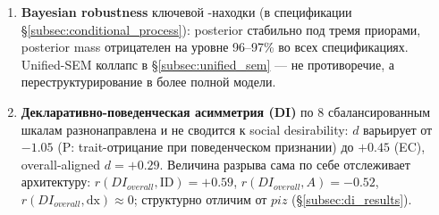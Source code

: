 \begin{enumerate}
    \item \textbf{Bayesian robustness} ключевой \IMM{}-находки (в спецификации §\ref{subsec:conditional_process}): posterior стабильно под тремя приорами, posterior mass отрицателен на уровне 96--97\% во всех спецификациях. Unified-SEM коллапс \IMM{} в §\ref{subsec:unified_sem} --- не противоречие, а переструктурирование в более полной модели.
    \item \textbf{Декларативно-поведенческая асимметрия (DI)} по 8 сбалансированным шкалам разнонаправлена и не сводится к social desirability: $d$ варьирует от $-1.05$ (P: trait-отрицание при поведенческом признании) до $+0.45$ (EC), overall-aligned $d{=}{+}0.29$. Величина разрыва сама по себе отслеживает архитектуру: $r(DI_{overall}, \text{ID}){=}{+}0.59$, $r(DI_{overall}, A){=}{-}0.52$, $r(DI_{overall}, \text{dx}){\approx}0$; структурно отличим от $piz$ (§\ref{subsec:di_results}).
\end{enumerate}
